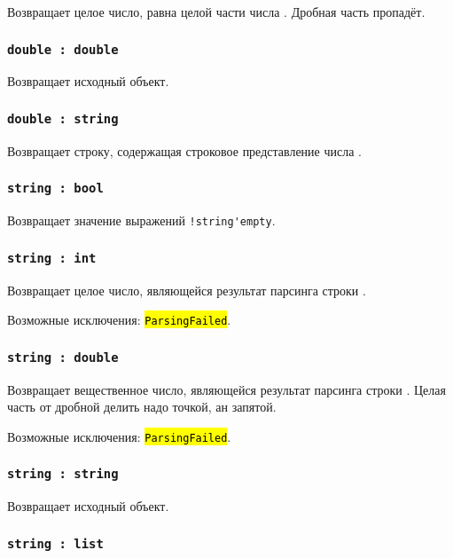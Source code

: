 \documentclass[a4paper, 14pt]{extarticle}
\newcommand{\ferror}[1]{{\fontsize{11pt}{12pt}\tt{\sethlcolor{yellow}\hl{#1}}}}
\begin{document}
Возвращает целое число, равна целой части числа \double. Дробная часть пропадёт.

\subsubsection{\lstinline|double : double|}

Возвращает исходный объект.

\subsubsection{\lstinline|double : string|}

Возвращает строку, содержащая строковое представление числа \double.

\subsubsection{\lstinline|string : bool|}

Возвращает значение выражений \lstinline|!string'empty|.

\subsubsection{\lstinline|string : int|}

Возвращает целое число, являющейся результат парсинга строки \str.

Возможные исключения: \ferror{ParsingFailed}.

\subsubsection{\lstinline|string : double|}

Возвращает вещественное число, являющейся результат парсинга строки \str. Целая часть от дробной делить надо точкой, ан запятой.

Возможные исключения: \ferror{ParsingFailed}.

\subsubsection{\lstinline|string : string|}

Возвращает исходный объект.

\subsubsection{\lstinline|string : list|}
\end{document}
